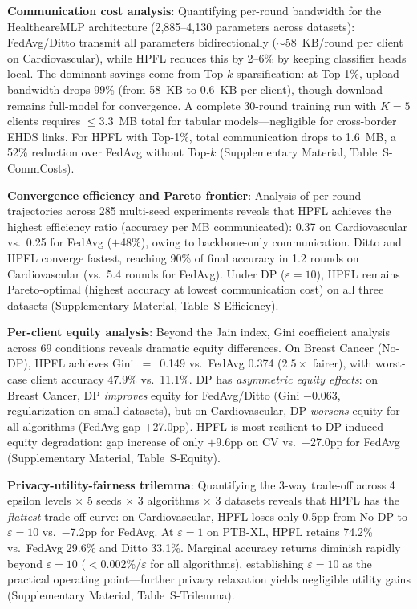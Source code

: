 \documentclass[conference,a4paper]{IEEEtran}
\begin{document}
\textbf{Communication cost analysis}: Quantifying per-round bandwidth for the HealthcareMLP architecture (2,885--4,130 parameters across datasets): FedAvg/Ditto transmit all parameters bidirectionally ($\sim$58~KB/round per client on Cardiovascular), while HPFL reduces this by 2--6\% by keeping classifier heads local. The dominant savings come from Top-$k$ sparsification: at Top-1\%, upload bandwidth drops 99\% (from 58~KB to 0.6~KB per client), though download remains full-model for convergence. A complete 30-round training run with $K{=}5$ clients requires $\leq$3.3~MB total for tabular models---negligible for cross-border EHDS links. For HPFL with Top-1\%, total communication drops to 1.6~MB, a 52\% reduction over FedAvg without Top-$k$ (Supplementary Material, Table~S-CommCosts).

\textbf{Convergence efficiency and Pareto frontier}: Analysis of per-round trajectories across 285 multi-seed experiments reveals that HPFL achieves the highest efficiency ratio (accuracy per MB communicated): 0.37 on Cardiovascular vs.\ 0.25 for FedAvg ($+$48\%), owing to backbone-only communication. Ditto and HPFL converge fastest, reaching 90\% of final accuracy in 1.2 rounds on Cardiovascular (vs.\ 5.4 rounds for FedAvg). Under DP ($\varepsilon{=}10$), HPFL remains Pareto-optimal (highest accuracy at lowest communication cost) on all three datasets (Supplementary Material, Table~S-Efficiency).

\textbf{Per-client equity analysis}: Beyond the Jain index, Gini coefficient analysis across 69 conditions reveals dramatic equity differences. On Breast Cancer (No-DP), HPFL achieves Gini~$=$~0.149 vs.\ FedAvg 0.374 ($2.5\times$ fairer), with worst-case client accuracy 47.9\% vs.\ 11.1\%. DP has \textit{asymmetric equity effects}: on Breast Cancer, DP \textit{improves} equity for FedAvg/Ditto (Gini $-$0.063, regularization on small datasets), but on Cardiovascular, DP \textit{worsens} equity for all algorithms (FedAvg gap $+$27.0pp). HPFL is most resilient to DP-induced equity degradation: gap increase of only $+$9.6pp on CV vs.\ $+$27.0pp for FedAvg (Supplementary Material, Table~S-Equity).

\textbf{Privacy-utility-fairness trilemma}: Quantifying the 3-way trade-off across 4 epsilon levels $\times$ 5 seeds $\times$ 3 algorithms $\times$ 3 datasets reveals that HPFL has the \textit{flattest} trade-off curve: on Cardiovascular, HPFL loses only 0.5pp from No-DP to $\varepsilon{=}10$ vs.\ $-$7.2pp for FedAvg. At $\varepsilon{=}1$ on PTB-XL, HPFL retains 74.2\% vs.\ FedAvg 29.6\% and Ditto 33.1\%. Marginal accuracy returns diminish rapidly beyond $\varepsilon{=}10$ ($<$0.002\%/$\varepsilon$ for all algorithms), establishing $\varepsilon{=}10$ as the practical operating point---further privacy relaxation yields negligible utility gains (Supplementary Material, Table~S-Trilemma).
\end{document}
